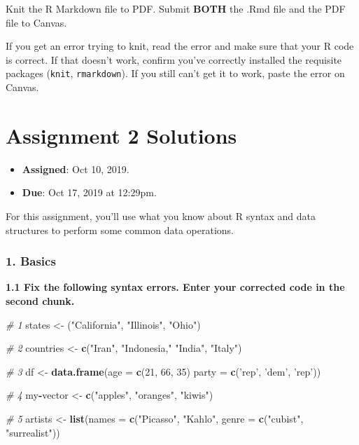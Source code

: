 \documentclass[]{book}
\newenvironment{Shaded}{\begin{snugshade}}{\end{snugshade}}
\newcommand{\KeywordTok}[1]{\textcolor[rgb]{0.13,0.29,0.53}{\textbf{#1}}}
\newcommand{\DataTypeTok}[1]{\textcolor[rgb]{0.13,0.29,0.53}{#1}}
\newcommand{\DecValTok}[1]{\textcolor[rgb]{0.00,0.00,0.81}{#1}}
\newcommand{\StringTok}[1]{\textcolor[rgb]{0.31,0.60,0.02}{#1}}
\newcommand{\CommentTok}[1]{\textcolor[rgb]{0.56,0.35,0.01}{\textit{#1}}}
\newcommand{\OperatorTok}[1]{\textcolor[rgb]{0.81,0.36,0.00}{\textbf{#1}}}
\newcommand{\NormalTok}[1]{#1}
\providecommand{\tightlist}{%
  \setlength{\itemsep}{0pt}\setlength{\parskip}{0pt}}
\begin{document}
Knit the R Markdown file to PDF. Submit \textbf{BOTH} the .Rmd file and
the PDF file to Canvas.

If you get an error trying to knit, read the error and make sure that
your R code is correct. If that doesn't work, confirm you've correctly
installed the requisite packages (\texttt{knit}, \texttt{rmarkdown}). If
you still can't get it to work, paste the error on Canvas.

\section{Assignment 2 Solutions}\label{assignment-2-solutions}

\begin{itemize}
\tightlist
\item
  \textbf{Assigned}: Oct 10, 2019.
\item
  \textbf{Due}: Oct 17, 2019 at 12:29pm.
\end{itemize}

For this assignment, you'll use what you know about R syntax and data
structures to perform some common data operations.

\subsubsection*{1. Basics}\label{basics}

\textbf{1.1 Fix the following syntax errors. Enter your corrected code
in the second chunk.}

\begin{Shaded}
\begin{Highlighting}[]
\CommentTok{# 1}
\NormalTok{states <-}\StringTok{ }\NormalTok{(}\StringTok{"California"}\NormalTok{, }\StringTok{"Illinois"}\NormalTok{, }\StringTok{"Ohio"}\NormalTok{)}

\CommentTok{# 2}
\NormalTok{countries <-}\StringTok{ }\KeywordTok{c}\NormalTok{(}\StringTok{"Iran"}\NormalTok{, }\StringTok{"Indonesia,"} \StringTok{"India"}\NormalTok{, }\StringTok{"Italy"}\NormalTok{)}

\CommentTok{# 3}
\NormalTok{df <-}\StringTok{ }\KeywordTok{data.frame}\NormalTok{(}\DataTypeTok{age =} \KeywordTok{c}\NormalTok{(}\DecValTok{21}\NormalTok{, }\DecValTok{66}\NormalTok{, }\DecValTok{35}\NormalTok{)}
                 \DataTypeTok{party =} \KeywordTok{c}\NormalTok{(}\StringTok{'rep'}\NormalTok{, }\StringTok{'dem'}\NormalTok{, }\StringTok{'rep'}\NormalTok{))}

\CommentTok{# 4}
\NormalTok{my}\OperatorTok{-}\NormalTok{vector <-}\StringTok{ }\KeywordTok{c}\NormalTok{(}\StringTok{"apples"}\NormalTok{, }\StringTok{"oranges"}\NormalTok{, }\StringTok{"kiwis"}\NormalTok{)}

\CommentTok{# 5}
\NormalTok{artists <-}\StringTok{ }\KeywordTok{list}\NormalTok{(}\DataTypeTok{names =} \KeywordTok{c}\NormalTok{(}\StringTok{"Picasso"}\NormalTok{, }\StringTok{"Kahlo"}\NormalTok{,}
                \DataTypeTok{genre =} \KeywordTok{c}\NormalTok{(}\StringTok{"cubist"}\NormalTok{, }\StringTok{"surrealist"}\NormalTok{))}
\end{Highlighting}
\end{Shaded}
\end{document}
